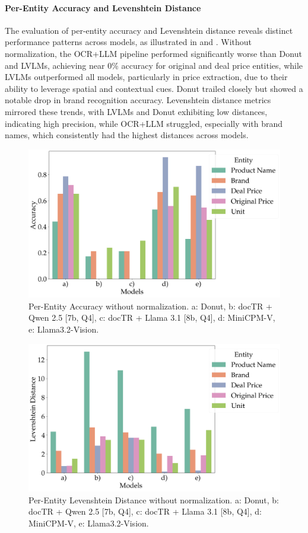 \documentclass[11pt]{article}
\begin{document}
\paragraph{Per-Entity Accuracy and Levenshtein Distance}  
The evaluation of per-entity accuracy and Levenshtein distance reveals distinct performance patterns across models, as illustrated in  and . Without normalization, the OCR+LLM pipeline performed significantly worse than Donut and LVLMs, achieving near 0\% accuracy for original and deal price entities, while LVLMs outperformed all models, particularly in price extraction, due to their ability to leverage spatial and contextual cues. Donut trailed closely but showed a notable drop in brand recognition accuracy. Levenshtein distance metrics mirrored these trends, with LVLMs and Donut exhibiting low distances, indicating high precision, while OCR+LLM struggled, especially with brand names, which consistently had the highest distances across models.  

\begin{figure}[h!]
    \centering
    \includegraphics[width=0.8\linewidth]{figures/accuracies_raw.png}
    \caption{Per-Entity Accuracy without normalization. a: Donut, b: docTR + Qwen 2.5 [7b, Q4], c: docTR + Llama 3.1 [8b, Q4], d: MiniCPM-V, e: Llama3.2-Vision.}
    \label{fig:eval_final_acc_raw}
\end{figure}

\begin{figure}[h!]
    \centering
    \includegraphics[width=0.8\linewidth]{figures/levdistances_raw.png}
    \caption{Per-Entity Levenshtein Distance without normalization. a: Donut, b: docTR + Qwen 2.5 [7b, Q4], c: docTR + Llama 3.1 [8b, Q4], d: MiniCPM-V, e: Llama3.2-Vision.}
    \label{fig:eval_final_levdis_raw}
\end{figure}
\end{document}
